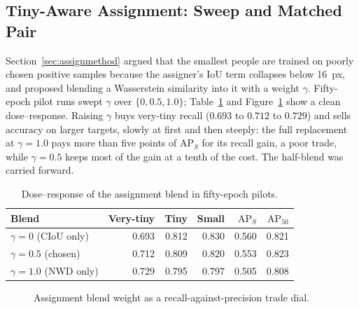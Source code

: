 \subsection{Tiny-Aware Assignment: Sweep and Matched Pair}
\label{sec:assignresults}
Section~\ref{sec:assignmethod} argued that the smallest people are trained on
poorly chosen positive samples because the assigner's IoU term collapses below
16~px, and proposed blending a Wasserstein similarity into it with a weight
$\gamma$. Fifty-epoch pilot runs swept $\gamma$ over $\{0, 0.5, 1.0\}$;
Table~\ref{tab:gamma} and Figure~\ref{fig:gammadose} show a clean
dose--response. Raising $\gamma$ buys very-tiny recall ($0.693$ to $0.712$ to
$0.729$) and sells accuracy on larger targets, slowly at first and then
steeply: the full replacement at $\gamma=1.0$ pays more than five points of
$\mathrm{AP}_S$ for its recall gain, a poor trade, while $\gamma=0.5$ keeps
most of the gain at a tenth of the cost. The half-blend was carried forward.

\begin{table}[tbp]
  \centering
  \caption{Dose--response of the assignment blend in fifty-epoch pilots.}
  \label{tab:gamma}
  \begin{tabular}{@{}l r r r r r@{}}
    \toprule
    Blend & Very-tiny & Tiny & Small & $\mathrm{AP}_S$ & $\mathrm{AP}_{50}$ \\
    \midrule
    $\gamma=0$ (CIoU only)   & 0.693 & 0.812 & 0.830 & 0.560 & 0.821 \\
    $\gamma=0.5$ (chosen)    & 0.712 & 0.809 & 0.820 & 0.553 & 0.823 \\
    $\gamma=1.0$ (NWD only)  & 0.729 & 0.795 & 0.797 & 0.505 & 0.808 \\
    \bottomrule
  \end{tabular}
\end{table}

\begin{figure}[tbp]
  \centering
  \caption{Assignment blend weight as a recall-against-precision trade dial.}
  \label{fig:gammadose}
\end{figure}

